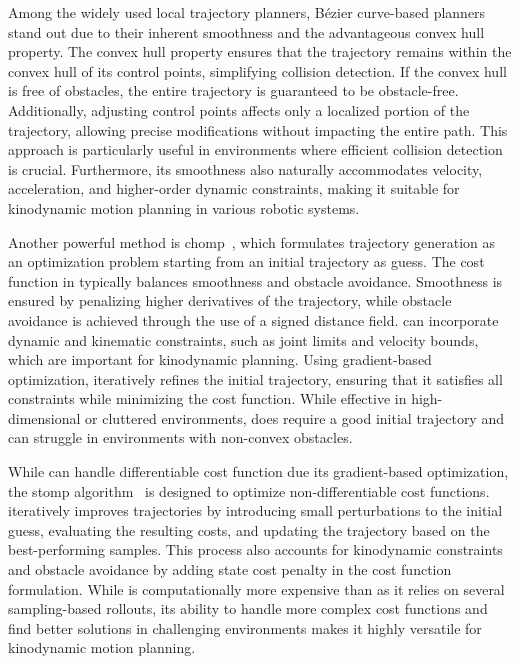 Among the widely used local trajectory planners, Bézier curve-based planners~\cite{cBezier,cBezier2} stand out due to their inherent smoothness and the advantageous convex hull property.
The convex hull property ensures that the trajectory remains within the convex hull of its control points, simplifying collision detection. 
If the convex hull is free of obstacles, the entire trajectory is guaranteed to be obstacle-free. 
Additionally, adjusting control points affects only a localized portion of the trajectory, allowing precise modifications without impacting the entire path.
This approach is particularly useful in environments where efficient collision detection is crucial.
Furthermore, its smoothness also naturally accommodates velocity, acceleration, and higher-order dynamic constraints, making it suitable for kinodynamic motion planning in various robotic systems. 

Another powerful method is \gls{chomp}~\cite{cCHOMP}, which formulates trajectory generation as an optimization problem starting from an initial trajectory as guess. 
The cost function in  typically balances smoothness and obstacle avoidance.
Smoothness is ensured by penalizing higher derivatives of the trajectory, while obstacle avoidance is achieved through the use of a signed distance field. 
 can incorporate dynamic and kinematic constraints, such as joint limits and velocity bounds, which are important for kinodynamic planning. 
Using gradient-based optimization,  iteratively refines the initial trajectory, ensuring that it satisfies all constraints while minimizing the cost function. 
While effective in high-dimensional or cluttered environments,  does require a good initial trajectory and can struggle in environments with non-convex obstacles.

While  can handle differentiable cost function due its gradient-based optimization, the \gls{stomp} algorithm~\cite{cSTOMP} is designed to optimize non-differentiable cost functions. 
 iteratively improves trajectories by introducing small perturbations to the initial guess, evaluating the resulting costs, and updating the trajectory based on the best-performing samples. 
This process also accounts for kinodynamic constraints and obstacle avoidance by adding state cost penalty in the cost function formulation.
While  is computationally more expensive than  as it relies on several sampling-based rollouts, its ability to handle more complex cost functions and find better solutions in challenging environments makes it highly versatile for kinodynamic motion planning.

